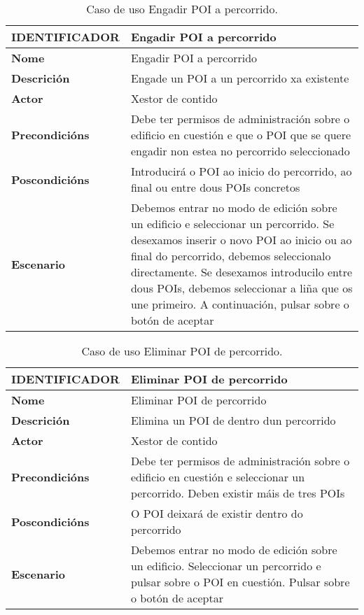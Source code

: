 \begin{table}[tbh]
	\begin{tabular}{|l|p{10cm}|}
		\hline 
		\textbf{IDENTIFICADOR}	& \textbf{Engadir POI a percorrido} \\ 
		\hline 
		\textbf{Nome} & Engadir POI a percorrido \\ 
		\hline 
		\textbf{Descrición} & Engade un POI a un percorrido xa existente \\ 
		\hline 
		\textbf{Actor} & Xestor de contido \\ 
		\hline 
		\textbf{Precondicións} & Debe ter permisos de administración sobre o edificio en cuestión e que o POI que se quere engadir non estea no percorrido seleccionado \\ 
		\hline 
		\textbf{Poscondicións} & Introducirá o POI ao inicio do percorrido, ao final ou entre dous POIs concretos \\ 
		\hline 
		\textbf{Escenario} & Debemos entrar no modo de edición sobre un edificio e seleccionar un percorrido. Se desexamos inserir o novo POI ao inicio ou ao final do percorrido, debemos seleccionalo directamente. Se desexamos introducilo entre dous POIs, debemos seleccionar a liña que os une primeiro. A continuación, pulsar sobre o botón de aceptar \\ 
		\hline 
	\end{tabular}
	\caption{Caso de uso Engadir POI a percorrido.}
	\label{tab:cuEngadirPOIPercorrido}
\end{table}

\begin{table}[tbh]
	\begin{tabular}{|l|p{10cm}|}
		\hline 
		\textbf{IDENTIFICADOR}	& \textbf{Eliminar POI de percorrido} \\ 
		\hline 
		\textbf{Nome} & Eliminar POI de percorrido \\ 
		\hline 
		\textbf{Descrición} & Elimina un POI de dentro dun percorrido \\ 
		\hline 
		\textbf{Actor} & Xestor de contido \\ 
		\hline 
		\textbf{Precondicións} & Debe ter permisos de administración sobre o edificio en cuestión e seleccionar un percorrido. Deben existir máis de tres POIs \\ 
		\hline 
		\textbf{Poscondicións} & O POI deixará de existir dentro do percorrido \\ 
		\hline 
		\textbf{Escenario} & Debemos entrar no modo de edición sobre un edificio. Seleccionar un percorrido e pulsar sobre o POI en cuestión. Pulsar sobre o botón de aceptar \\ 
		\hline 
	\end{tabular}
	\caption{Caso de uso Eliminar POI de percorrido.}
	\label{tab:cuEliminarPOIPercorrido}
\end{table}

